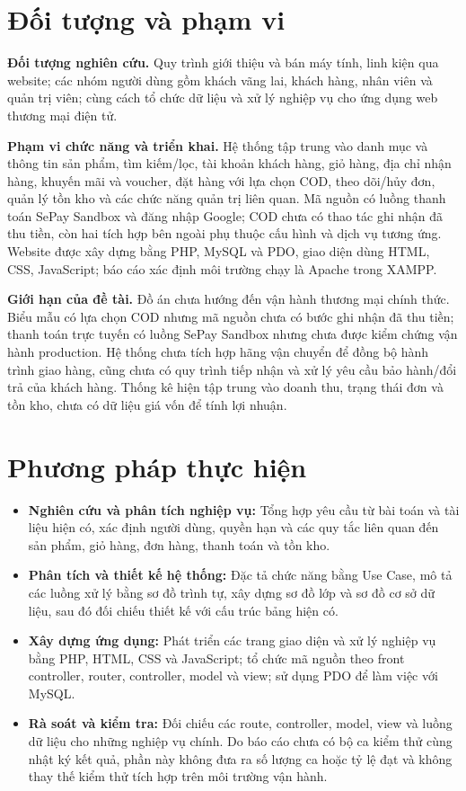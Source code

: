 \section{Đối tượng và phạm vi}
\noindent\textbf{Đối tượng nghiên cứu.} Quy trình giới thiệu và bán máy tính, linh kiện qua website; các nhóm người dùng gồm khách vãng lai, khách hàng, nhân viên và quản trị viên; cùng cách tổ chức dữ liệu và xử lý nghiệp vụ cho ứng dụng web thương mại điện tử.

\noindent\textbf{Phạm vi chức năng và triển khai.} Hệ thống tập trung vào danh mục và thông tin sản phẩm, tìm kiếm/lọc, tài khoản khách hàng, giỏ hàng, địa chỉ nhận hàng, khuyến mãi và voucher, đặt hàng với lựa chọn COD, theo dõi/hủy đơn, quản lý tồn kho và các chức năng quản trị liên quan. Mã nguồn có luồng thanh toán SePay Sandbox và đăng nhập Google; COD chưa có thao tác ghi nhận đã thu tiền, còn hai tích hợp bên ngoài phụ thuộc cấu hình và dịch vụ tương ứng. Website được xây dựng bằng PHP, MySQL và PDO, giao diện dùng HTML, CSS, JavaScript; báo cáo xác định môi trường chạy là Apache trong XAMPP.

\noindent\textbf{Giới hạn của đề tài.} Đồ án chưa hướng đến vận hành thương mại chính thức. Biểu mẫu có lựa chọn COD nhưng mã nguồn chưa có bước ghi nhận đã thu tiền; thanh toán trực tuyến có luồng SePay Sandbox nhưng chưa được kiểm chứng vận hành production. Hệ thống chưa tích hợp hãng vận chuyển để đồng bộ hành trình giao hàng, cũng chưa có quy trình tiếp nhận và xử lý yêu cầu bảo hành/đổi trả của khách hàng. Thống kê hiện tập trung vào doanh thu, trạng thái đơn và tồn kho, chưa có dữ liệu giá vốn để tính lợi nhuận.


\section{Phương pháp thực hiện}
\begin{itemize}
    \item \textbf{Nghiên cứu và phân tích nghiệp vụ:} Tổng hợp yêu cầu từ bài toán và tài liệu hiện có, xác định người dùng, quyền hạn và các quy tắc liên quan đến sản phẩm, giỏ hàng, đơn hàng, thanh toán và tồn kho.
    \item \textbf{Phân tích và thiết kế hệ thống:} Đặc tả chức năng bằng Use Case, mô tả các luồng xử lý bằng sơ đồ trình tự, xây dựng sơ đồ lớp và sơ đồ cơ sở dữ liệu, sau đó đối chiếu thiết kế với cấu trúc bảng hiện có.
    \item \textbf{Xây dựng ứng dụng:} Phát triển các trang giao diện và xử lý nghiệp vụ bằng PHP, HTML, CSS và JavaScript; tổ chức mã nguồn theo front controller, router, controller, model và view; sử dụng PDO để làm việc với MySQL.
    \item \textbf{Rà soát và kiểm tra:} Đối chiếu các route, controller, model, view và luồng dữ liệu cho những nghiệp vụ chính. Do báo cáo chưa có bộ ca kiểm thử cùng nhật ký kết quả, phần này không đưa ra số lượng ca hoặc tỷ lệ đạt và không thay thế kiểm thử tích hợp trên môi trường vận hành.
\end{itemize}


